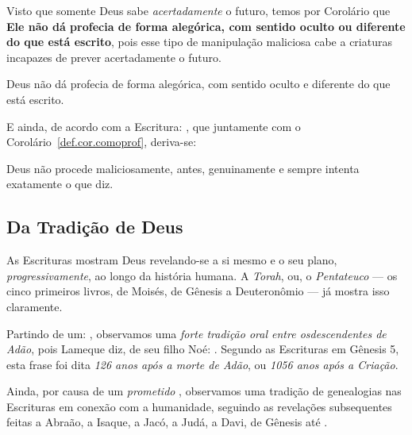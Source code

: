     Visto que somente Deus sabe \emph{acertadamente} o futuro, temos por Corolário que \textbf{Ele  não  dá  profecia  de  forma
    alegórica, com sentido oculto ou diferente do que está escrito}, pois esse tipo de manipulação maliciosa  cabe  a  criaturas
    incapazes de prever acertadamente o futuro.

    \begin{COR}
        \label{def.cor.comoprof}
        Deus não dá profecia de forma alegórica, com sentido oculto e diferente do que está escrito.
    \end{COR}

    E ainda, de acordo com a Escritura: , que
    juntamente com o Corolário~\ref{def.cor.comoprof}, deriva-se:

    \begin{COR}
        \label{def.cor.genu}
        Deus não procede maliciosamente, antes, genuinamente e sempre intenta exatamente o que diz.
    \end{COR}


    \subsection{Da Tradição de Deus}

    As Escrituras mostram Deus revelando-se a si mesmo e o seu plano, \emph{progressivamente}, ao longo da  história  humana.  A
    \emph{Torah}, ou, o \emph{Pentateuco} --- os cinco primeiros livros, de Moisés, de Gênesis a Deuteronômio --- já mostra isso
    claramente.

    Partindo de um: , observamos uma \emph{forte tradição oral entre osdescendentes de Adão}, pois  Lameque  diz,
    de seu filho Noé: . Segundo as Escrituras em Gênesis 5, esta frase foi dita \emph{126
    anos após a morte de Adão}, ou \emph{1056 anos após a Criação}.

    Ainda, por causa de um \emph{prometido} ,  observamos  uma  tradição  de
    genealogias nas Escrituras em conexão com a humanidade, seguindo as revelações subsequentes feitas a  Abraão,  a  Isaque,  a
    Jacó, a Judá, a Davi, de Gênesis até .

